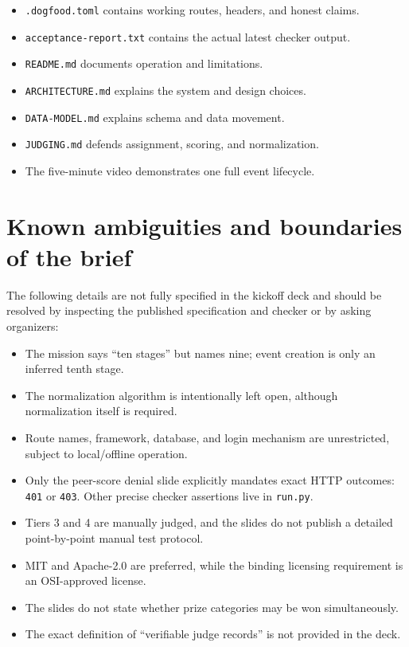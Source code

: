 \documentclass[11pt]{article}
\newcommand{\checkbox}{\textcolor{DeepBlue}{\ding{113}}}
\begin{document}
\begin{itemize}
  \item[\checkbox] \texttt{.dogfood.toml} contains working routes, headers, and honest claims.
  \item[\checkbox] \texttt{acceptance-report.txt} contains the actual latest checker output.
  \item[\checkbox] \texttt{README.md} documents operation and limitations.
  \item[\checkbox] \texttt{ARCHITECTURE.md} explains the system and design choices.
  \item[\checkbox] \texttt{DATA-MODEL.md} explains schema and data movement.
  \item[\checkbox] \texttt{JUDGING.md} defends assignment, scoring, and normalization.
  \item[\checkbox] The five-minute video demonstrates one full event lifecycle.
\end{itemize}

\section{Known ambiguities and boundaries of the brief}

The following details are not fully specified in the kickoff deck and should be resolved by inspecting the published specification and checker or by asking organizers:

\begin{itemize}
  \item The mission says ``ten stages'' but names nine; event creation is only an inferred tenth stage.
  \item The normalization algorithm is intentionally left open, although normalization itself is required.
  \item Route names, framework, database, and login mechanism are unrestricted, subject to local/offline operation.
  \item Only the peer-score denial slide explicitly mandates exact HTTP outcomes: \texttt{401} or \texttt{403}. Other precise checker assertions live in \texttt{run.py}.
  \item Tiers 3 and 4 are manually judged, and the slides do not publish a detailed point-by-point manual test protocol.
  \item MIT and Apache-2.0 are preferred, while the binding licensing requirement is an OSI-approved license.
  \item The slides do not state whether prize categories may be won simultaneously.
  \item The exact definition of ``verifiable judge records'' is not provided in the deck.
\end{itemize}
\end{document}
